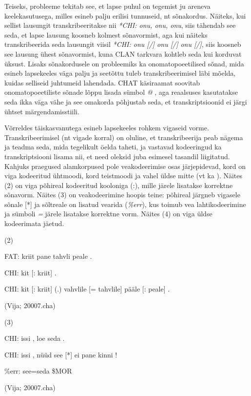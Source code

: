 \documentclass[12pt]{article}
\begin{document}
Teiseks, probleeme tekitab see, et lapse puhul on tegemist ju areneva keelekasutusega, milles esineb palju erilisi tunnuseid, nt sõnakordus. Näiteks, kui sellist lausungit transkribeeritakse nii \emph{*CHI: onu, onu, onu}, siis tähendab see seda, et lapse lausung koosneb kolmest sõnavormist, aga kui näiteks transkribeerida seda lausungit viisil \emph{*CHI: onu [/] onu [/] onu [/]}, siis koosneb see lausung ühest sõnavormist, kuna CLAN tarkvara kohtleb seda kui korduvat üksust. Lisaks sõnakordusele on probleemiks ka onomatopoeetilised sõnad, mida esineb lapsekeeles väga palju ja seetõttu tuleb transkribeerimisel läbi mõelda, kuidas selliseid juhtumeid lahendada. CHAT käsiraamat soovitab onomatopoeetiliste sõnade lõppu lisada sümbol \emph{@} \citep[72--73]{Argus2007}, aga reaalsuses kasutatakse seda ikka väga vähe ja see omakorda põhjustab seda, et transkriptsioonid ei järgi ühtset märgendamisstiili.

Võrreldes täiskasvanutega esineb lapsekeeles rohkem vigaseid vorme. Transkribeerimisel (nt vigade korral) on oluline, et transkribeerija peab nägema ja teadma seda, mida tegelikult öelda taheti, ja vastavad kodeeringud ka transkriptsiooni lisama nii, et need oleksid juba esimesel tasandil liigitatud. \citep[74]{Argus2007} Kahjuks praegused alamkorpused pole veakodeerimise osas järjepidevad, kord on viga kodeeritud ühtmoodi, kord teistmoodi ja vahel üldse mitte (vt ka \citealp{ARGUS_liigitus}). Näites (2) on viga põhireal kodeeritud kooloniga (:), mille järele lisatakse korrektne sõnavorm. Näites (3) on veakodeerimine hoopis teine: põhireal järgneb vigasele sõnale [*] ja sõltreale on lisatud vearida (\emph{\%err}), kus  toimub vea lahtikodeerimine ja sümboli \emph{=} järele lisatakse korrektne vorm. Näites (4) on viga üldse kodeerimata jäetud.
\hfill

(2)
\begin{description}
    \item*FAT: kriit pane tahvli peale .
    \item*CHI: kit [: kriit] .
    \item*CHI: kit [: kriit] (.) vahvlile [= tahvlile] pääle [: peale] .
    \item(Vija; 20007.cha)
\end{description}
\hfill

(3)
\begin{description}
    \item*CHI: issi , loe seda .
    \item*CHI: issi , nüüd see [*] ei pane kinni !
    \item\%err: see=seda \$MOR
    \item(Vija; 20007.cha)
\end{description}
\hfill
\end{document}
